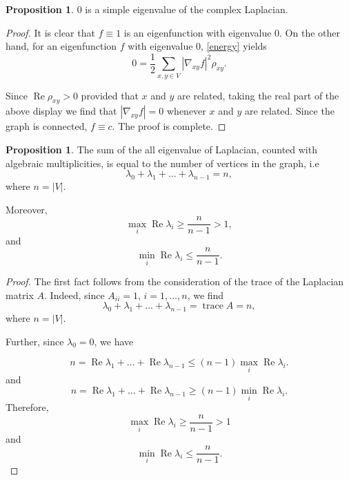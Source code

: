 \documentclass[a4paper,11pt]{amsart}
\theoremstyle{definition}
\newtheorem{proposition}[theorem]{Proposition}
\DeclareMathOperator\trace{trace}
\renewcommand{\Re}{\operatorname{Re}}%
\begin{document}
\begin{proposition}
$0$ is a simple eigenvalue of the complex Laplacian.
\end{proposition}
\begin{proof}
It is clear that $f \equiv 1$ is an eigenfunction with eigenvalue $0$. On the other hand, for an eigenfunction $f$ with eigenvalue $0$, \eqref{energy} yields
\begin{equation*}
0 = \frac{1}{2} \sum_{x,y \in V} |\nabla_{xy} f|^2 \rho_{xy}.
\end{equation*}



Since $\Re \rho_{xy} >0$ provided that $x$ and $y$ are related, taking the real part of the above display we find that $|\nabla_{xy} f| = 0$ whenever $x$ and $y$ are related. Since the graph is connected, $f \equiv c$. The proof is complete.
\end{proof}
\begin{proposition}
The sum of the all eigenvalue of Laplacian, counted with algebraic multiplicities, is equal to the number of vertices in the graph, i.e
\begin{equation}\label{sumofev}
\lambda_0+\lambda_1+\dots+\lambda_{n-1}=n,
\end{equation}
where $n=|V|$.

Moreover, 
\begin{equation}\label{estimate::reOfeigenvalue}
\max_i \Re \lambda_{i}\ge \dfrac{n}{n-1}>1,
\end{equation}
and
\begin{equation*}
\min_i \Re \lambda_{i}\le \dfrac{n}{n-1}.
\end{equation*}
\end{proposition}

\begin{proof}
The first fact follows from the consideration of the trace of the Laplacian matrix $A$. Indeed, since $A_{ii} = 1$, $i=1,\ldots,n$, we find
\begin{equation*}
\lambda_0+\lambda_1+\dots+\lambda_{n-1}=\trace A=n,
\end{equation*}
where $n=|V|$.

Further, since $\lambda_0=0$, we have

\begin{equation*}
n=\Re \lambda_1+\dots+\Re \lambda_{n-1}\le (n-1)\max_i \Re \lambda_{i}.
\end{equation*}
and 
\begin{equation*}
n=\Re \lambda_1+\dots+\Re \lambda_{n-1}\ge (n-1)\min_i \Re \lambda_{i}.
\end{equation*}
Therefore, 
\begin{equation*}
\max_i \Re \lambda_{i}\ge \dfrac{n}{n-1}>1
\end{equation*}
and
\begin{equation*}
\min_i \Re \lambda_{i}\le \dfrac{n}{n-1}.
\end{equation*}
\end{proof}
\end{document}
